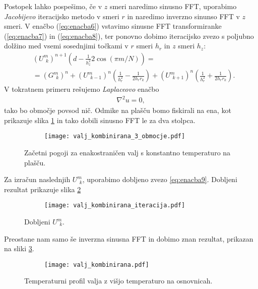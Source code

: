 \documentclass[12pt,a4paper]{article}
\begin{document}
Postopek lahko pospešimo, če v $z$ smeri naredimo sinusno FFT, uporabimo \textit{Jacobijevo} iteracijsko metodo v smeri $r$ in naredimo inverzno sinunso FFT v $z$ smeri. V enačbo (\ref{eq:enacba6}) vstavimo sinusne FFT transformiranke (\ref{eq:enacba7}) in (\ref{eq:enacba8}), ter ponovno dobimo iteracijsko zvezo s poljubno dolžino med vsemi sosednjimi točkami v $r$ smeri $h_r$ in $z$ smeri $h_z$:
\begin{align} \label{eq:enacba9}
&(U^{m} _{ \ \ k })^{n+1}  (d - \frac{1}{h_z^{2}}2\cos(\pi m /N))= \nonumber \\
&= (G^{m} _{ \ \ k}) ^{n} + (U^{m} _{ \ \ k-1 })^{n} \left(\frac{1}{h_r ^{2}} - \frac{1}{2h_r r_k} \right) + (U^{m} _{ \ \ k+1 })^{n} \left(\frac{1}{h_r ^{2}} + \frac{1}{2h_r r_k} \right).
\end{align}
V tokratnem primeru rešujemo \textit{Laplaceovo} enačbo
\begin{align*}
\nabla ^{2} u = 0,
\end{align*}
tako bo območje povsod nič. Odmike na plašču bomo fiskirali na ena, kot prikazuje slika \ref{fig:slika14} in tako dobili sinusno FFT le za dva stolpca.
\begin{figure}[H]
    \centering
    \begin{subfigure}[b]{0.5\textwidth}  			
        \texttt{[image: valj\_kombinirana\_3\_obmocje.pdf]}
    \end{subfigure}
    \caption{Začetni pogoji za enakostraničen valj s konstantno temperaturo na plašču.} \label{fig:slika14}
\end{figure}
\noindent Za izračun naslednjih $U^{m} _{ \ \ k }$, uporabimo dobljeno zvezo \ref{eq:enacba9}. Dobljeni rezultat prikazuje slika \ref{fig:slika15}
\begin{figure}[H]
    \centering
    \begin{subfigure}[b]{0.5\textwidth}  			
        \texttt{[image: valj\_kombinirana\_iteracija.pdf]}
    \end{subfigure}
    \caption{Dobljeni $U^{m} _{ \ \ k }$. } \label{fig:slika15}
\end{figure}

\noindent Preostane nam samo še inverzna sinusna FFT in dobimo znan rezultat, prikazan na sliki \ref{fig:slika16}.

\begin{figure}[H]
    \centering
    \begin{subfigure}[b]{0.5\textwidth}  			
        \texttt{[image: valj\_kombinirana.pdf]}
    \end{subfigure}
    \caption{Temperaturni profil valja z višjo temperaturo na osnovnicah.} \label{fig:slika16}
\end{figure}
\end{document}
